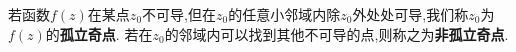 若函数$f(z)$在某点$z_0$不可导,但在$z_0$的任意小邻域内除$z_0$外处处可导,我们称$z_0$为$f(z)$的\textbf{孤立奇点}.
若在$z_0$的邻域内可以找到其他不可导的点,则称之为\textbf{非孤立奇点}.


